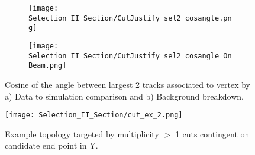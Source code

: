 \begin{figure}[H]
  \begin{subfigure}[t]{0.37\textwidth}
\texttt{[image: Selection\_II\_Section/CutJustify\_sel2\_cosangle.png]}
  \caption{ }
  \end{subfigure} 
  \hspace{25mm}
  \begin{subfigure}[t]{0.37\textwidth}
\texttt{[image: Selection\_II\_Section/CutJustify\_sel2\_cosangle\_OnBeam.png]}
  \caption{ }
  \end{subfigure} 
\caption{Cosine of the angle between largest 2 tracks associated to vertex by a) Data to simulation comparison and b) Background breakdown. }
\label{fig:cutjust_sel2_cosangle}
\end{figure}


\begin{figure}[H]
  \centering
  \texttt{[image: Selection\_II\_Section/cut\_ex\_2.png]}
  \caption{ Example topology targeted by multiplicity $>$ 1 cuts contingent on candidate end point in Y. }
\label{fig:cut_ex_2}
\end{figure}




